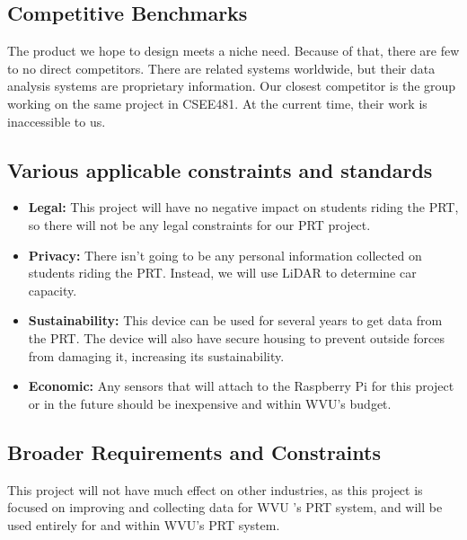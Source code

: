 \subsection{Competitive Benchmarks}
The product we hope to design meets a niche need. Because of that, there are few to no direct competitors. There are related systems worldwide, but their data analysis systems are proprietary information. Our closest competitor is the group working on the same project in CSEE481. At the current time, their work is inaccessible to us.

\subsection{Various applicable constraints and standards}
\begin{itemize}
    \item \textbf{Legal:} This project will have no negative impact on students riding the PRT, so there will not be any legal constraints for our PRT project.
    \item \textbf{Privacy:} There isn't going to be any personal information collected on students riding the PRT. Instead, we will use LiDAR to determine car capacity.
    \item \textbf{Sustainability:} This device can be used for several years to get data from the PRT. The device will also have secure housing to prevent outside forces from damaging it, increasing its sustainability.
    \item \textbf{Economic:} Any sensors that will attach to the Raspberry Pi for this project or in the future should be inexpensive and within WVU’s budget.
\end{itemize}

\subsection{Broader Requirements and Constraints}
This project will not have much effect on other industries, as this project is focused on improving and collecting data for WVU 's PRT system, and will be used entirely for and within WVU’s PRT system.